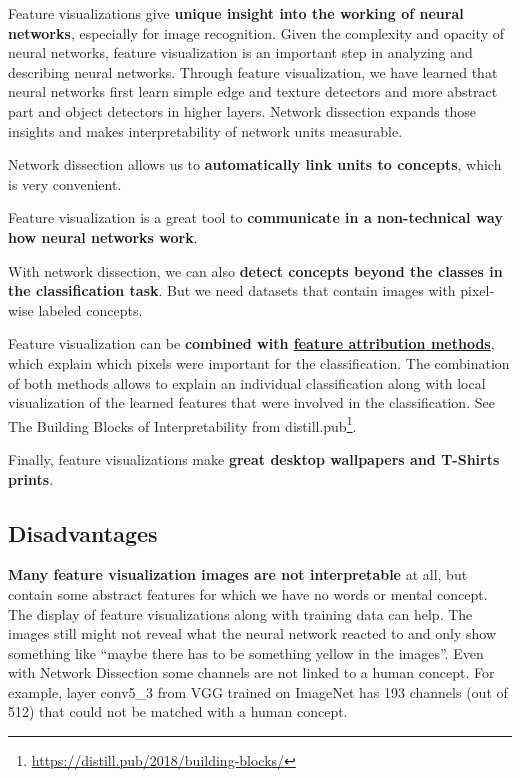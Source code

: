 \documentclass[
  12pt,
]{krantz}
\renewcommand{\href}[2]{#2\footnote{\url{#1}}}
\begin{document}
Feature visualizations give \textbf{unique insight into the working of neural networks}, especially for image recognition.
Given the complexity and opacity of neural networks, feature visualization is an important step in analyzing and describing neural networks.
Through feature visualization, we have learned that neural networks first learn simple edge and texture detectors and more abstract part and object detectors in higher layers.
Network dissection expands those insights and makes interpretability of network units measurable.

Network dissection allows us to \textbf{automatically link units to concepts}, which is very convenient.

Feature visualization is a great tool to \textbf{communicate in a non-technical way how neural networks work}.

With network dissection, we can also \textbf{detect concepts beyond the classes in the classification task}.
But we need datasets that contain images with pixel-wise labeled concepts.

Feature visualization can be \textbf{combined with \protect\hyperlink{pixel-attribution}{feature attribution methods}}, which explain which pixels were important for the classification.
The combination of both methods allows to explain an individual classification along with local visualization of the learned features that were involved in the classification.
See \href{https://distill.pub/2018/building-blocks/}{The Building Blocks of Interpretability from distill.pub}.

Finally, feature visualizations make \textbf{great desktop wallpapers and T-Shirts prints}.

\hypertarget{disadvantages-18}{%
\subsection{Disadvantages}\label{disadvantages-18}}

\textbf{Many feature visualization images are not interpretable} at all, but contain some abstract features for which we have no words or mental concept.
The display of feature visualizations along with training data can help.
The images still might not reveal what the neural network reacted to and only show something like ``maybe there has to be something yellow in the images''.
Even with Network Dissection some channels are not linked to a human concept.
For example, layer conv5\_3 from VGG trained on ImageNet has 193 channels (out of 512) that could not be matched with a human concept.
\end{document}
